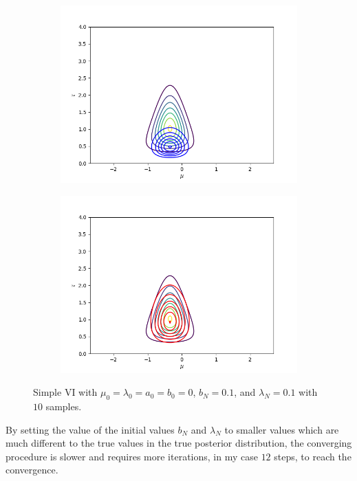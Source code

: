 \documentclass[11pt]{extarticle}
\newcommand{\0}{\mathbf{0}}
\renewcommand{\(}{\left(}
\renewcommand{\)}{\right)}
\theoremstyle{definition}
\begin{document}
\begin{enumerate}
\begin{figure}[!ht]
\begin{subfigure}{.4\textwidth}
			\centering
			\includegraphics[width=\linewidth]{2_4_2_3}
		\end{subfigure}
		\begin{subfigure}{.4\textwidth}
			\centering
			\includegraphics[width=\linewidth]{2_4_2_12}
		\end{subfigure}
		\caption{Simple VI with $\mu_{0} = \lambda_{0} = a_{0} = b_{0} = 0$, $b_{N} = 0.1$, and $\lambda_{N} = 0.1$ with $10$ samples.}
		\label{fig:2_4_2}
	\end{figure}
	\par By setting the value of the initial values $b_{N}$ and $\lambda_{N}$ to smaller values which are much different to the true values in the true posterior distribution, the converging procedure is slower and requires more iterations, in my case $12$ steps, to reach the convergence.
	

\end{enumerate}
\end{document}
